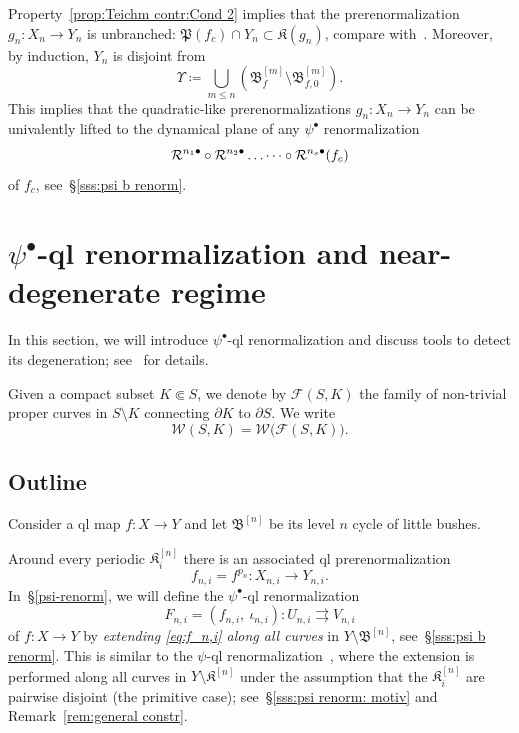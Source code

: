 \documentclass{amsart}
\newcommand{\bfilled}{{\boldsymbol{\mathfrak K} }}
\newcommand{\filled}{{\mathfrak K }}
\newcommand{\Post}{{\mathfrak P }}
\newcommand{\bush}{{\mathfrak B }}
\newcommand{\bbush}{{\boldsymbol {\mathfrak B} }}
\newcommand{\1}{{\mathbb 1 }}
\newcommand{\Fam}{{\mathcal F}}
\newcommand{\Width}{{\mathcal W}}
\begin{document}
\begin{rem}
\label{rem:prop:Teichm contr}
Property~\ref{prop:Teichm contr:Cond 2} implies that the prerenormalization $g_n\colon X_n\to Y_n$ is unbranched: $\Post(f_c)\cap Y_n\subset \filled(g_n)$, compare with~\cite{McM2}. Moreover, by induction, $Y_n$ is disjoint from 
\[\Upsilon\coloneqq \bigcup_{m\le n} \left(\bbush^{[m]}_f\setminus \bush^{[m]}_{f,0} \right).\]
This implies that the quadratic-like prerenormalizations $g_n\colon X_n\to Y_n$ can be univalently lifted to the dynamical plane of any $\psi^\bullet$ renormalization \[{\mathcal R}^{n_1\bullet}\circ{\mathcal R}^{n_2\bullet}\dots\dots \circ {\mathcal R}^{n_s\bullet} (f_c)\]of 
$f_c$, see~\S\ref{sss:psi b renorm}.
\end{rem}




\section{$\psi^\bullet$-ql renormalization and near-degenerate regime}
 In this section, we will introduce $\psi^\bullet$-ql renormalization and discuss tools to detect its degeneration; see~\cite{A,K, covering lemma, L:book, DL2} for details.

 Given a compact subset $K\Subset S$, we denote by $\Fam(S,K)$ the family of non-trivial proper curves in $S\setminus K$ connecting $\partial K$ to $\partial S$. We write
 \begin{equation}
\label{eq:width:dfn}
 \Width(S,K) =\Width \big(\Fam(S,K)\big). 
 \end{equation}
 

 
\subsection{Outline} Consider a ql map $f\colon X\to Y$ and let $\bbush^{[n]}$ be its level $n$ cycle of little bushes. 


Around every periodic $\filled^{[n]}_i$ there is an associated ql prerenormalization 
\begin{equation}
\label{eq:f_n,i}
f_{n,i}=f^{p_n}\colon X_{n,i}\to Y_{n,i}.
\end{equation}
 In~\S\ref{psi-renorm}, we will define the $\psi^\bullet$-ql renormalization 
\begin{equation}
\label{eq:F_n,i}
F_{n,i} = (f_{n,i},\ \iota_{n,i})\colon U_{n,i} \rightrightarrows V_{n,i}
\end{equation}
of $f\colon X\to Y$ by \emph{extending \eqref{eq:f_n,i} along all curves} in $Y\setminus \bbush^{[n]}$, see~\S\ref{sss:psi b renorm}. This is similar to the $\psi$-ql renormalization~\cite{K}, where the extension is performed along all curves in $Y\setminus  \bfilled^{[n]}$ under the assumption that the $\filled^{[n]}_i$ are pairwise disjoint  (the primitive case); see~\S\ref{sss:psi renorm: motiv} and Remark~\ref{rem:general constr}.
\end{document}

